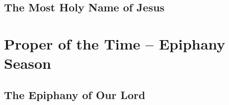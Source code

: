 {{\def\definevesperspropers{}
\newcommand{\printhymnnote}{
	\noindent\printnote{Hymn. \emph{Jesu Redémptor ómnium}, page \pageref{hymn-jesuredemptoromnium}.\\}
	{
		\definevesperspropers
		\printvr[\greblockcustos]{\vrtex}{\vtranslation}{\rtranslation}
	}
}

\bigskip
\benedicamusdomino{}
}

{
\section{The Most Holy Name of Jesus}
\subtitle{2nd Class}
\medskip
\subtitle{This feast is celebrated on the Sunday between the Octave Day of the Nativity and the Epiphany of Our Lord.  If no Sunday occurs within that time, this feast is then celebrated on January 2.}
\medskip
\subtitle{When the Feast of the Most Holy Name of Jesus occurs on January 5, the First Vespers of the Epiphany on page \pageref{epiphany} are sung without a commemoration of the Holy Name of Jesus.}

\def\definevesperspropers{}
\def\printfullhymn{
	\label{hymn-jesudulcismemoria}
	{
		\printhymn{\oldstylenums{\hymnlinetwo}}{\hymninitial}{\hymntex}{\hymntranslation}
		\def\vrlinebreak{T}
		\printvr[\greblockcustos]{\vrtex}{\vtranslation}{\rtranslation}
	}
}

\bigskip
\benedicamusdomino{}
}

{
\chapter{Proper of the Time -- Epiphany Season}
\label{epiphany}
\section{The Epiphany of Our Lord}
\subtitle{1st Class}
\medskip
\subtitle{January 5, I Vespers as at II Vespers except where indicated.}
\medskip
\subtitle{January 6, II Vespers}

}}
